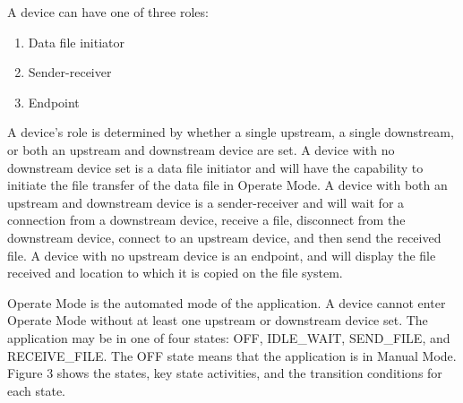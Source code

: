 \documentclass[10pt,twocolumn]{article}
\begin{document}
A device can have one of three roles: 
\begin{enumerate}
\item Data file initiator
\item Sender-receiver
\item Endpoint
\end{enumerate}
A device's role is determined by whether a single upstream, a single downstream, or both an upstream and downstream device are set.
A device with no downstream device set is a data file initiator and will have the capability to initiate the file transfer of the data file in Operate Mode.
A device with both an upstream and downstream device is a sender-receiver and will wait for a connection from a downstream device, receive a file, disconnect from the downstream device, connect to an upstream device, and then send the received file.
A device with no upstream device is an endpoint, and will display the file received and location to which it is copied on the file system.

Operate Mode is the automated mode of the application.
A device cannot enter Operate Mode without at least one upstream or downstream device set.
The application may be in one of four states: OFF, IDLE\_WAIT, SEND\_FILE, and RECEIVE\_FILE.
The OFF state means that the application is in Manual Mode.
Figure 3 shows the states, key state activities, and the transition conditions for each state.
\end{document}
